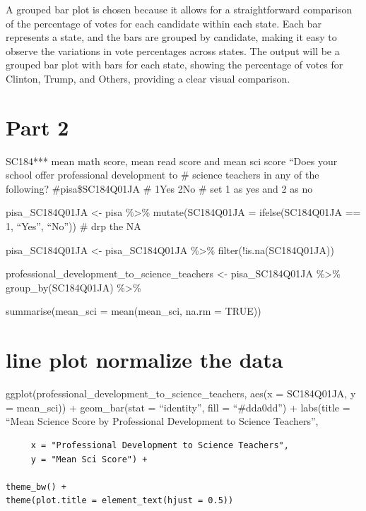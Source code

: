 \documentclass[
  letterpaper,
  DIV=11,
  numbers=noendperiod]{scrreprt}
\begin{document}
A grouped bar plot is chosen because it allows for a straightforward
comparison of the percentage of votes for each candidate within each
state. Each bar represents a state, and the bars are grouped by
candidate, making it easy to observe the variations in vote percentages
across states. The output will be a grouped bar plot with bars for each
state, showing the percentage of votes for Clinton, Trump, and Others,
providing a clear visual comparison.


\hypertarget{part-2}{%
\chapter{\texorpdfstring{\textbf{Part 2}}{Part 2}}\label{part-2}}

SC184*** mean math score, mean read score and mean sci score ``Does your
school offer professional development to \# science teachers in any of
the following? \#pisa\$SC184Q01JA \# 1Yes 2No \# set 1 as yes and 2 as
no

pisa\_SC184Q01JA \textless- pisa \%\textgreater\% mutate(SC184Q01JA =
ifelse(SC184Q01JA == 1, ``Yes'', ``No'')) \# drp the NA

pisa\_SC184Q01JA \textless- pisa\_SC184Q01JA \%\textgreater\%
filter(!is.na(SC184Q01JA))

professional\_development\_to\_science\_teachers \textless-
pisa\_SC184Q01JA \%\textgreater\% group\_by(SC184Q01JA) \%\textgreater\%

summarise(mean\_sci = mean(mean\_sci, na.rm = TRUE))


\hypertarget{line-plot-normalize-the-data}{%
\chapter{line plot normalize the
data}\label{line-plot-normalize-the-data}}

ggplot(professional\_development\_to\_science\_teachers, aes(x =
SC184Q01JA, y = mean\_sci)) + geom\_bar(stat = ``identity'', fill =
``\#dda0dd'') + labs(title = ``Mean Science Score by Professional
Development to Science Teachers'',

\begin{verbatim}
     x = "Professional Development to Science Teachers",
     y = "Mean Sci Score") +
     
theme_bw() +
theme(plot.title = element_text(hjust = 0.5))
\end{verbatim}
\end{document}
